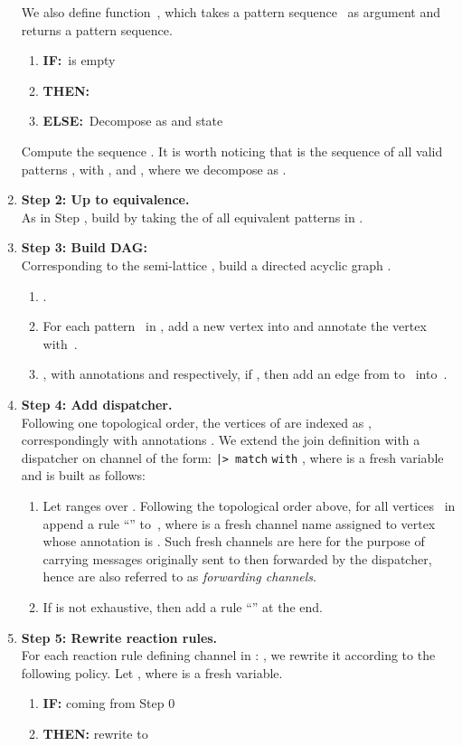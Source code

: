 \documentclass{LMCS}
\let \lst \lstinline
\renewcommand{\_}{\mathord{\rule[-.25ex]{1ex}{.15ex}}}
\begin{document}
\begin{enumerate}[\ ]
  We also define function~, which takes a pattern sequence~
  as argument and returns a pattern sequence.
  \begin{enumerate}[\ ]
  \item {\bf IF:}\  is empty
  \item {\bf THEN:}\ 
  \item {\bf ELSE:}\ Decompose  as  and state 
  \end{enumerate}
  Compute the sequence .  It is worth noticing
  that  is the sequence of all valid patterns
  , with , and , where we
  decompose  as .
\item {\bf Step 2: Up to equivalence.}\ \hspace*{1cm} \\
  As in Step , build  by taking the  of all
  equivalent patterns in .
\item {\bf Step 3: Build DAG:} \hspace*{1cm} \\
  Corresponding to the semi-lattice , build a
  directed acyclic graph .
  \begin{enumerate}[(1)]
  \item .
  \item For each pattern~ in , add a new vertex 
    into  and annotate the vertex with~.
  \item , with annotations
     and  respectively, if ,
    then add an edge from  to~ into~.
  \end{enumerate}
\item {\bf Step 4: Add dispatcher.} \hspace*{1cm} \\
  Following one topological order, the vertices of  are indexed as
  , correspondingly with annotations . We extend the join definition  with a
  dispatcher on channel  of the form:  \lst"|> match" 
  \lst"with" , where  is a fresh variable and  is
  built as follows:
  \begin{enumerate}[(1)]
  \item Let  ranges over . Following the
    topological order above, for all vertices~ in  append a
    rule ``'' to~,
    where  is a fresh channel name assigned to
    vertex~ whose annotation is . Such fresh channels are here
    for the purpose of carrying messages originally sent to  then
    forwarded by the dispatcher, hence are also referred to as
    \emph{forwarding channels}.
  \item If  is not exhaustive, then add a rule ``'' at the end.
  \end{enumerate}
\item {\bf Step 5: Rewrite reaction rules.} \hspace*{1cm} \\
  For each reaction rule defining channel  in :
  , we rewrite it according to
  the following policy. Let , where
   is a fresh variable.
  \begin{enumerate}[\ ]
  \item {\bf IF:} coming from Step 0
  \item {\bf THEN:} rewrite to
    

\end{enumerate}
\end{enumerate}
\end{document}
